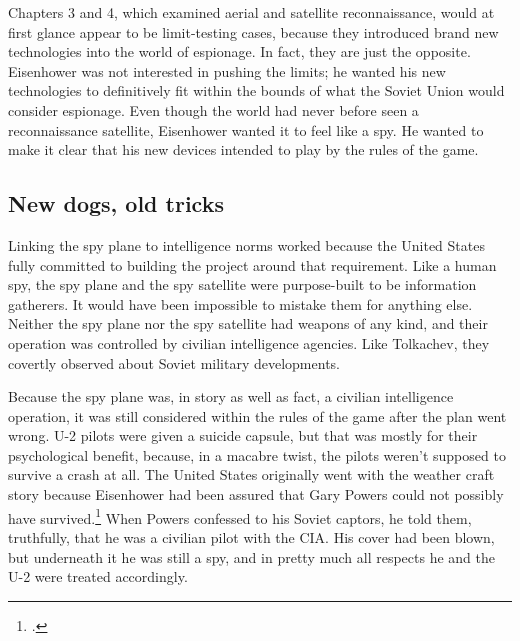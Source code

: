 \documentclass{memoir}
\begin{document}

Chapters 3 and 4, which examined aerial and satellite reconnaissance, would at first glance appear to be limit-testing cases, because they introduced brand new technologies into the world of espionage. In fact, they are just the opposite. Eisenhower was not interested in pushing the limits; he wanted his new technologies to definitively fit within the bounds of what the Soviet Union would consider espionage. Even though the world had never before seen a reconnaissance satellite, Eisenhower wanted it to feel like a spy. He wanted to make it clear that his new devices intended to play by the rules of the game.

\subsection{New dogs, old tricks}


Linking the spy plane to intelligence norms worked because the United States fully committed to building the project around that requirement. Like a human spy, the spy plane and the spy satellite were purpose-built to be information gatherers. It would have been impossible to mistake them for anything else. Neither the spy plane nor the spy satellite had weapons of any kind, and their operation was controlled by civilian intelligence agencies. Like Tolkachev, they covertly observed about Soviet military developments.

Because the spy plane was, in story as well as fact, a civilian intelligence operation, it was still considered within the rules of the game after the plan went wrong. U-2 pilots were given a suicide capsule, but  that was mostly for their psychological benefit, because, in a macabre twist, the pilots weren't supposed to survive a crash at all. The United States originally went with the weather craft story because Eisenhower had been assured that Gary Powers could not possibly have survived.\footcite[p.~35]{lindgren_trust_2000} When Powers confessed to his Soviet captors, he told them, truthfully, that he was a civilian pilot with the CIA. His cover had been blown, but underneath it he was still a spy, and in pretty much all respects he and the U-2 were treated accordingly.
\end{document}

